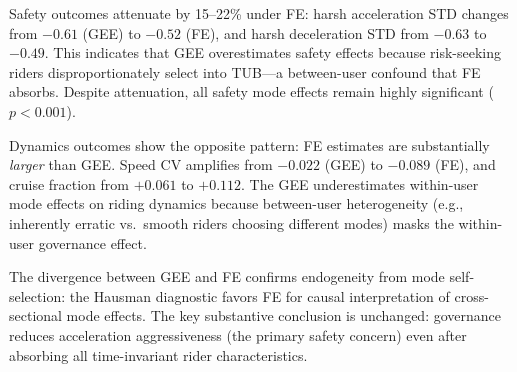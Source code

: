 Safety outcomes attenuate by 15--22\% under FE: harsh acceleration STD changes from $-0.61$ (GEE) to $-0.52$ (FE), and harsh deceleration STD from $-0.63$ to $-0.49$. This indicates that GEE overestimates safety effects because risk-seeking riders disproportionately select into TUB---a between-user confound that FE absorbs. Despite attenuation, all safety mode effects remain highly significant ($p < 0.001$).

Dynamics outcomes show the opposite pattern: FE estimates are substantially \textit{larger} than GEE. Speed CV amplifies from $-0.022$ (GEE) to $-0.089$ (FE), and cruise fraction from $+0.061$ to $+0.112$. The GEE underestimates within-user mode effects on riding dynamics because between-user heterogeneity (e.g., inherently erratic vs.\ smooth riders choosing different modes) masks the within-user governance effect.

The divergence between GEE and FE confirms endogeneity from mode self-selection: the Hausman diagnostic favors FE for causal interpretation of cross-sectional mode effects. The key substantive conclusion is unchanged: governance reduces acceleration aggressiveness (the primary safety concern) even after absorbing all time-invariant rider characteristics.

